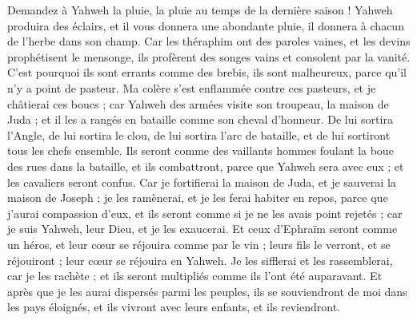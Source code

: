 \begin{multicols}{2}
\VerseOne{}Demandez à Yahweh la pluie, la pluie au temps de la dernière saison ! Yahweh produira des éclairs, et il vous donnera une abondante pluie, il donnera à chacun de l'herbe dans son champ.
Car les théraphim ont des paroles vaines, et les devins prophétisent le mensonge, ils profèrent des songes vains et consolent par la vanité. C'est pourquoi ils sont errants comme des brebis, ils sont malheureux, parce qu'il n'y a point de pasteur.
Ma colère s'est enflammée contre ces pasteurs, et je châtierai ces boucs ; car Yahweh des armées visite son troupeau, la maison de Juda ; et il les a rangés en bataille comme son cheval d'honneur.
De lui sortira l'Angle, de lui sortira le clou, de lui sortira l'arc de bataille, et de lui sortiront tous les chefs ensemble.
Ils seront comme des vaillants hommes foulant la boue des rues dans la bataille, et ils combattront, parce que Yahweh sera avec eux ; et les cavaliers seront confus.
Car je fortifierai la maison de Juda, et je sauverai la maison de Joseph ; je les ramènerai, et je les ferai habiter en repos, parce que j'aurai compassion d'eux, et ils seront comme si je ne les avais point rejetés ; car je suis Yahweh, leur Dieu, et je les exaucerai.
Et ceux d'Ephraïm seront comme un héros, et leur cœur se réjouira comme par le vin ; leurs fils le verront, et se réjouiront ; leur cœur se réjouira en Yahweh.
Je les sifflerai et les rassemblerai, car je les rachète ; et ils seront multipliés comme ils l'ont été auparavant.
Et après que je les aurai dispersés parmi les peuples, ils se souviendront de moi dans les pays éloignés, et ils vivront avec leurs enfants, et ils reviendront.

\end{multicols}

